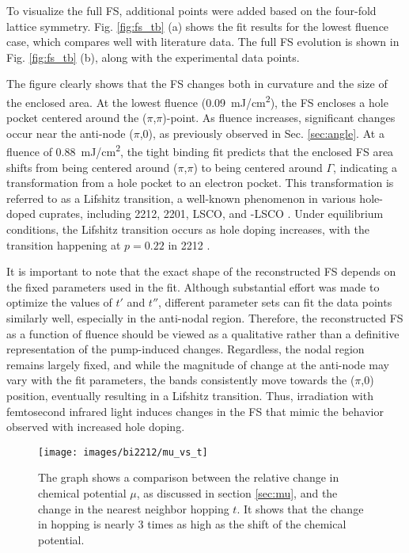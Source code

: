 To visualize the full FS, additional points were added based on the four-fold lattice symmetry.
Fig. \ref{fig:fs_tb} (a) shows the fit results for the lowest fluence case, which compares well with literature data.
The full FS evolution is shown in Fig. \ref{fig:fs_tb} (b), along with the experimental data points.

The figure clearly shows that the FS changes both in curvature and the size of the enclosed area.
At the lowest fluence (\qty{0.09}{\milli\joule/\centi\meter\squared}), the FS encloses a hole pocket centered around the ($\pi$,$\pi$)-point.
As fluence increases, significant changes occur near the anti-node ($\pi$,$0$), as previously observed in Sec. \ref{sec:angle}.
At a fluence of \qty{0.88}{\milli\joule/\centi\meter\squared}, the tight binding fit predicts that the enclosed FS area shifts from being centered around ($\pi$,$\pi$) to being centered around $\Gamma$, indicating a transformation from a hole pocket to an electron pocket.
This transformation is referred to as a Lifshitz transition, a well-known phenomenon in various hole-doped cuprates, including 2212, 2201, LSCO, and -LSCO \cite{kaminski_change_2006,matt_electron_2015,ding_disappearance_2019,kondo_hole-concentration_2004}.
Under equilibrium conditions, the Lifshitz transition occurs as hole doping increases, with the transition happening at $p=0.22$ in 2212 \cite{kaminski_change_2006}.

It is important to note that the exact shape of the reconstructed FS depends on the fixed parameters used in the fit.
Although substantial effort was made to optimize the values of $t'$ and $t''$, different parameter sets can fit the data points similarly well, especially in the anti-nodal region.
Therefore, the reconstructed FS as a function of fluence should be viewed as a qualitative rather than a definitive representation of the pump-induced changes.
Regardless, the nodal region remains largely fixed, and while the magnitude of change at the anti-node may vary with the fit parameters, the bands consistently move towards the ($\pi$,$0$) position, eventually resulting in a Lifshitz transition.
Thus, irradiation with femtosecond infrared light induces changes in the FS that mimic the behavior observed with increased hole doping.

\begin{figure}
	\centering
	\texttt{[image: images/bi2212/mu\_vs\_t]}
	\caption{The graph shows a comparison between the relative change in chemical potential $\mu$, as discussed in section \ref{sec:mu}, and the change in the nearest neighbor hopping $t$. It shows that the change in hopping is nearly 3 times as high as the shift of the chemical potential.}
	\label{fig:mu_t}
\end{figure}

